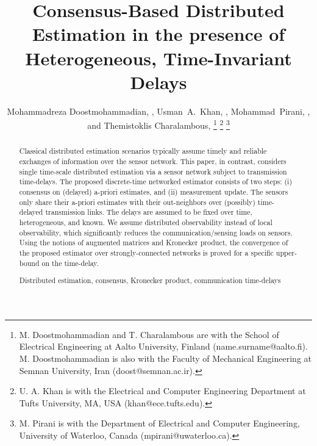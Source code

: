 \documentclass[journal]{IEEEtran}
\newcommand{\tb}{\color{blue}}
\begin{document}
\title{\huge \bf  Consensus-Based Distributed Estimation in the presence of Heterogeneous, Time-Invariant Delays
}
\author{Mohammadreza  Doostmohammadian, ,    Usman~A.~Khan, , Mohammad~Pirani, , and Themistoklis Charalambous, 	
\thanks{M.  Doostmohammadian and T. Charalambous are with the School of Electrical Engineering at Aalto University, Finland (name.surname@aalto.fi). M.  Doostmohammadian is also with the Faculty of Mechanical Engineering at Semnan University, Iran (doost@semnan.ac.ir).}
\thanks{{U. A. Khan} is with the Electrical and Computer Engineering Department at Tufts University, MA, USA (khan@ece.tufts.edu).} 
\thanks{{M. Pirani} is with the Department of Electrical and Computer Engineering, University of Waterloo, Canada (mpirani@uwaterloo.ca).
}}
\maketitle
\thispagestyle{empty} %
	
\begin{abstract}
	Classical distributed estimation scenarios typically assume timely and reliable exchanges of information over the sensor network. 
	This paper, in contrast, considers single time-scale distributed estimation via a sensor network subject to transmission time-delays. The proposed discrete-time networked estimator consists of two steps: (i) consensus on (delayed) a-priori estimates, and (ii) measurement update.  The sensors only share their a-priori estimates with their  out-neighbors  over (possibly) time-delayed transmission links. The delays are assumed to be fixed over time, heterogeneous, and known. We assume distributed observability instead of local observability, which significantly reduces the communication/sensing loads on sensors. Using the notions of augmented matrices and Kronecker product, the convergence of the proposed estimator over strongly-connected networks is proved for a specific upper-bound on the time-delay. 

\keywords  Distributed estimation, consensus, Kronecker product, communication time-delays 	
\end{abstract}
\end{document}

